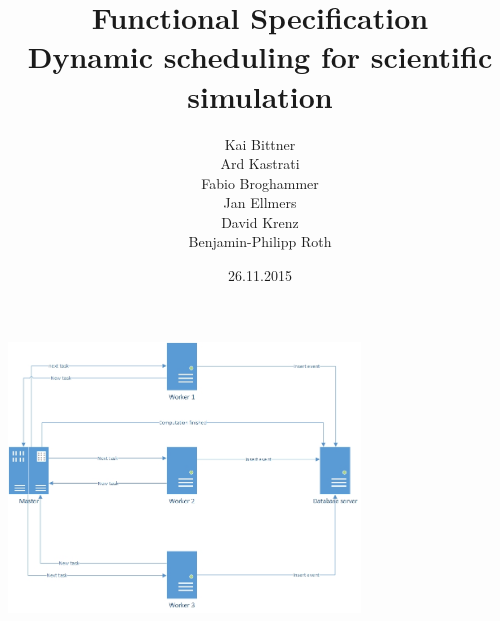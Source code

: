 \documentclass{article}
\title{Functional Specification\\Dynamic scheduling for scientific simulation}
\date{26.11.2015}
\author{Kai Bittner\\
		Ard Kastrati\\
		Fabio Broghammer\\
		Jan Ellmers\\
		David Krenz\\
		Benjamin-Philipp Roth}
\begin{document}
	\maketitle
	\newpage
	\tableofcontents
	\newpage
	
	\includegraphics[width=0.7\textwidth]{master worker.jpg} %
	
\end{document}
